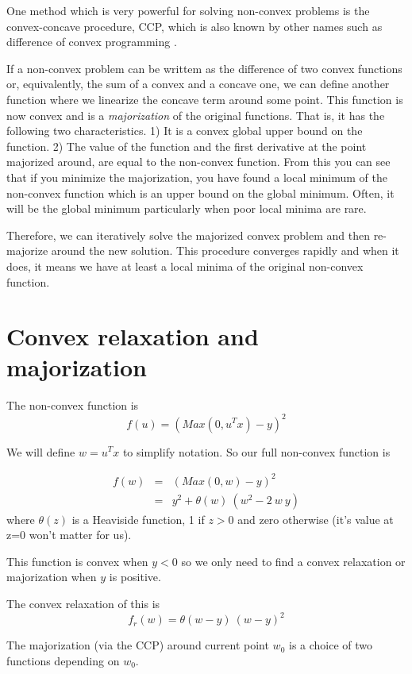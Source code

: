 \documentclass{article}
\begin{document}
One method which is very powerful for solving non-convex problems is the
convex-concave procedure, CCP, which is also known by other names such as
difference of convex programming \cite{boyd-ccp}.

If a non-convex problem can be writtem as the difference of two convex
functions or, equivalently, the sum of a convex and a concave one, we can
define another function where we linearize the concave term around some point.
This function is now convex and is a \emph{majorization} of the original
functions. That is, it has the following two characteristics. 1) It is a convex
global upper bound on the function. 2) The value of the function and the first
derivative at the point majorized around, are equal to the non-convex function.
From this you can see that if you minimize the majorization, you have found a
local minimum of the non-convex function which is an upper bound on the global
minimum. Often, it will be the global minimum particularly when poor local
minima are rare.



Therefore, we can iteratively solve the majorized convex problem and then
re-majorize around the new solution. This procedure converges rapidly and when
it does, it means we have at least a local minima of the original non-convex
function.

\section{Convex relaxation and majorization}

The non-convex function is
\[
f(u) = \left (Max(0, u^T x) - y \right) ^2
\]

We will define $w = u^T x$ to simplify notation. So our full non-convex function is

\begin{eqnarray}
f(w) & = & \left (Max(0, w) - y \right) ^2 \\
 & = & y^2 + \theta(w) ~ (w^2 - 2~w~y)
\end{eqnarray}
where $\theta(z)$ is a Heaviside function, 1 if $z > 0$ and zero otherwise (it's value at z=0
won't matter for us).

This function is convex when $y<0$ so we only need to find a convex relaxation or
majorization when $y$ is positive.

The convex relaxation of this is
\[
f_r(w) = \theta(w-y)~(w - y)^2
\]

The majorization (via the CCP) around current point $w_0$ is a choice of two
functions depending on $w_0$.
\end{document}
